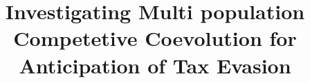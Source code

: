 \documentclass[a4paper]{article}
\begin{document}
\newcommand{\CITE}[1]{\textcolor{green}{CITE:#1}}
\newcommand{\TODO}[1]{\textcolor{blue}{TODO:#1}}
\newcommand{\NOTE}[1]{\textcolor{red}{NOTE:#1}}

\title{Investigating Multi population Competetive Coevolution for
  Anticipation of Tax Evasion}



\maketitle

 






\begin{flushleft}




\end{flushleft}
\end{document}
